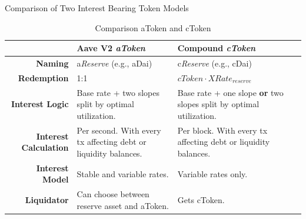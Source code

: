 \documentclass[handout]{beamer}
\begin{document}
\begin{frame}{Comparison of Two Interest Bearing Token Models}

\footnotesize
\begin{table}
  \center
  \begin{tabularx}{\textwidth}{rXX}
    \toprule
    ~	& \textbf{Aave V2} \emph{aToken} & \textbf{Compound} \emph{cToken}	\\
    \midrule
    \textbf{Naming} & a\textit{Reserve} (e.g., aDai) & c\textit{Reserve} (e.g., cDai) \vspace{0.5em}\\
    \textbf{Redemption} & 1:1 & $cToken \cdot XRate_{reserve}$ \vspace{0.5em}\\
    \textbf{Interest Logic} & Base rate + two slopes split by optimal utilization. & Base rate + one slope \textbf{or} two slopes split by optimal utilization. \vspace{0.5em}\\
    \textbf{Interest Calculation} & Per second. With every tx affecting debt or liquidity balances. & Per block. With every tx affecting debt or liquidity balances. \vspace{0.5em}\\
    \textbf{Interest Model} & Stable and variable rates. & Variable rates only. \vspace{0.5em}\\
    \textbf{Liquidator} & Can choose between reserve asset and aToken. & Gets cToken.\\
    \bottomrule
  \end{tabularx}
  \caption{Comparison aToken and cToken \cite{AaveV2,Compound}}
\end{table}

\end{frame}
\end{document}
